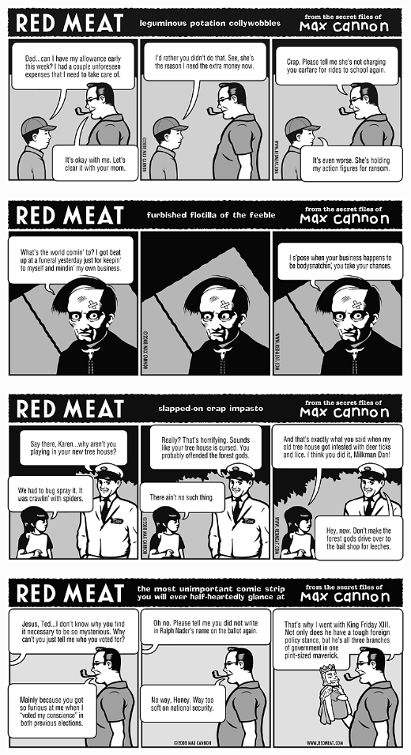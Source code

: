 \documentclass[a4paper,twoside,11pt]{article}
\begin{document}
\includegraphics[width=\textwidth]{redmeat_2008-10-21.png}



\includegraphics[width=\textwidth]{redmeat_2008-10-28.png}



\includegraphics[width=\textwidth]{redmeat_2008-11-04.png}



\includegraphics[width=\textwidth]{redmeat_2008-11-11.png}
\end{document}
